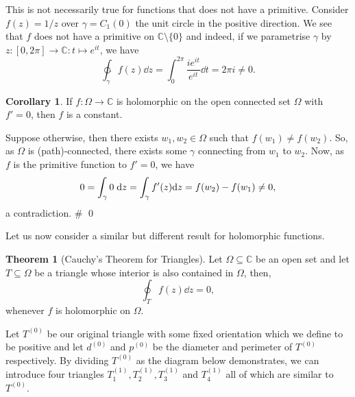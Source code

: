 \documentclass[
]{article}
\theoremstyle{definition}
\newtheorem{theorem}{Theorem}
\newtheorem{corollary}{Corollary}[theorem]
\theoremstyle{definition}
\begin{document}
This is not necessarily true for functions that does not have a
primitive. Consider \(f(z) = 1 / z\) over \(\gamma = C_1(0)\) the unit
circle in the positive direction. We see that \(f\) does not have a
primitive on \(\mathbb{C}\setminus \{0\}\) and indeed, if we parametrise
\(\gamma\) by \(z : [0, 2\pi] \to \mathbb{C} : t \mapsto e^{it}\), we
have
\[\ointctrclockwise_\gamma f(z) \dd z = \int_0^{2\pi} \frac{i e^{it}}{e^{it}} \dd t = 2\pi i \neq 0.\]

\begin{corollary}
  If \(f : \Omega \to \mathbb{C}\) is holomorphic on the open connected set \(\Omega\) 
  with \(f' = 0\), then \(f\) is a constant.
\end{corollary}
\proof

Suppose otherwise, then there exists \(w_1, w_2 \in \Omega\) such that
\(f(w_1) \neq f(w_2)\). So, as \(\Omega\) is (path)-connected, there
exists some \(\gamma\) connecting from \(w_1\) to \(w_2\). Now, as \(f\)
is the primitive function to \(f' = 0\), we have
\[0 = \int_\gamma 0\hspace{1mm} \dd z = \int_\gamma f'(z) \dd z = f(w_2) - f(w_1) \neq 0,\]
a contradiction. \# \qed

Let us now consider a similar but different result for holomorphic
functions.

\begin{theorem}[Cauchy's Theorem for Triangles]
  Let \(\Omega \subseteq \mathbb{C}\) be an open set and let \(T \subseteq \Omega\) 
  be a triangle whose interior is also contained in \(\Omega\), then, 
  \[\oint_T f(z) \dd z = 0,\]
  whenever \(f\) is holomorphic on \(\Omega\).
\end{theorem}

\proof

Let \(T^{(0)}\) be our original triangle with some fixed orientation
which we define to be positive and let \(d^{(0)}\) and \(p^{(0)}\) be
the diameter and perimeter of \(T^{(0)}\) respectively. By dividing
\(T^{(0)}\) as the diagram below demonstrates, we can introduce four
triangles \(T_1^{(1)}, T_2^{(1)}, T_3^{(1)}\) and \(T_4^{(1)}\) all of
which are similar to \(T^{(0)}\).
\end{document}
